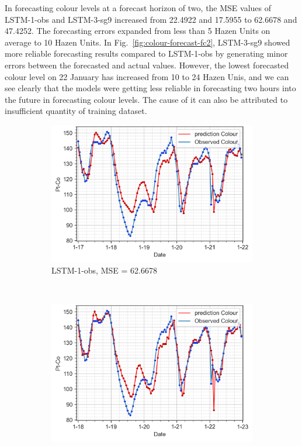 In forecasting colour levels at a forecast horizon of two, the MSE values of LSTM-1-obs and LSTM-3-sg9 increased from 22.4922 and 17.5955 to 62.6678 and 47.4252. The forecasting errors expanded from less than 5 Hazen Units on average to 10 Hazen Units. In Fig.~\ref{fig:colour-forecast-fc2}, LSTM-3-sg9 showed more reliable forecasting results compared to LSTM-1-obs by generating minor errors between the forecasted and actual values. However, the lowest forecasted colour level on 22 January has increased from 10 to 24 Hazen Unis, and we can see clearly that the models were getting less reliable in forecasting two hours into the future in forecasting colour levels. The cause of it can also be attributed to insufficient quantity of training dataset.

\begin{figure}[!ht]
  \centering
  \begin{subfigure}[t]{0.7\textwidth}
    \includegraphics[width=\linewidth]{imgs/results/steps/colour-lstm-1-fc2.png}
    \caption{LSTM-1-obs, MSE = 62.6678} \label{fig:colour-lstm-1-fc2}
  \end{subfigure}\\
  \vspace{1em}
  \begin{subfigure}[t]{0.7\textwidth}
    \includegraphics[width=\linewidth]{imgs/results/steps/colour-lstm-3-fc2.png}

\end{subfigure}
\end{figure}
